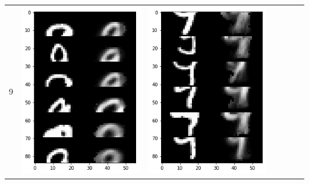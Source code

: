 \documentclass[12pt]{report} %
\begin{document}
\begin{tabular}{m{0.7cm}m{2.4cm}m{2.4cm}m{2.4cm}m{2.4cm}m{2.4cm}m{2.4cm}}
	9 & \includegraphics[scale=0.3]{pictures/KE_9_up.png} & \includegraphics[scale=0.3]{pictures/KE_9_down.png} &

\end{tabular}
\end{document}
